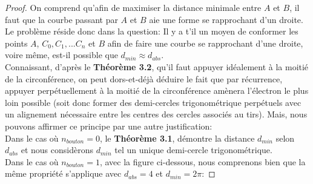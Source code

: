 \documentclass{amsart}
\theoremstyle{definition}
\theoremstyle{remark}
\numberwithin{equation}{section}
\begin{document}
\begin{proof}
  On comprend qu'afin de maximiser la distance minimale entre $A$ et $B$, il faut que la courbe passant par $A$ et $B$ aie une forme se rapprochant d'un droite.
  Le problème réside donc dans la question: Il y a t'il un moyen de conformer les points $A$, $C_0, C_1, ... C_n$ et $B$ afin de faire une courbe se rapprochant d'une droite, voire même, est-il possible que $d_{min}\approx d_{abs}$.\\

  Connaissant, d'après le \textbf{Théorème 3.2}, qu'il faut appuyer idéalement à la moitié de la circonférence, on peut dors-et-déjà déduire le fait que par récurrence, appuyer perpétuellement à la moitié de la circonférence amènera l'électron le plus loin
  possible (soit donc former des demi-cercles trigonométrique perpétuels avec un alignement nécessaire entre les centres des cercles associés au tirs). Mais, nous pouvons affirmer ce principe par une autre justification:\\

  Dans le cas où $n_{bouton}=0$, le \textbf{Théorème 3.1}, démontre la distance $d_{min}$ selon $d_{abs}$ et nous considèrons $d_{min}$ tel un unique demi-cercle trigonométrique.\\

  Dans le cas où $n_{bouton}=1$, avec la figure ci-dessous, nous comprenons bien que la même propriété s'applique avec $d_{abs}=4$ et $d_{min}=2\pi$:


\end{proof}
\end{document}
